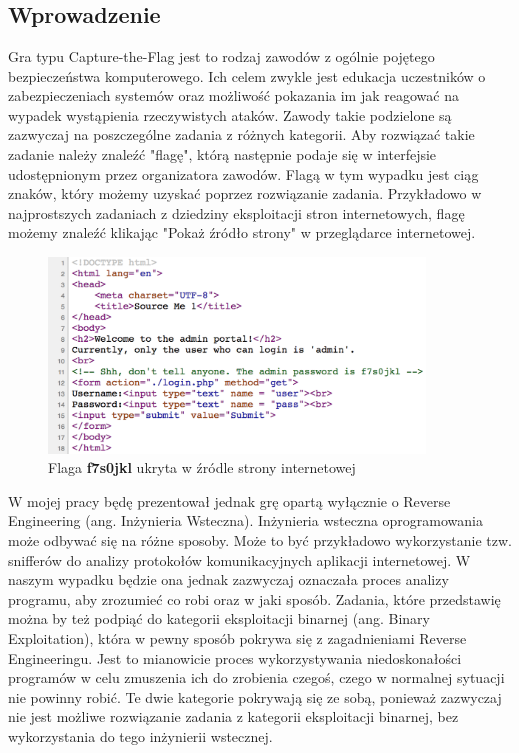 \documentclass[polish,12pt]{aghthesis}
\author{Piotr Szczygieł}
\date{\the\year}
\begin{document}
\maketitle

\tableofcontents
\newpage

\section{\SectionTitleProjectVision}
\label{sec:cel-wizja}

\subsection{Wprowadzenie}

Gra typu Capture-the-Flag jest to rodzaj zawodów z ogólnie pojętego
bezpieczeństwa komputerowego. Ich celem zwykle jest edukacja uczestników
o zabezpieczeniach systemów oraz możliwość pokazania im jak reagować
na wypadek wystąpienia rzeczywistych ataków. Zawody takie podzielone są zazwyczaj
na poszczególne zadania z różnych kategorii. Aby rozwiązać takie zadanie należy
znaleźć "flagę", którą następnie podaje się w interfejsie udostępnionym przez
organizatora zawodów. Flagą w tym wypadku jest ciąg znaków, który możemy uzyskać
poprzez rozwiązanie zadania. Przykładowo w najprostszych zadaniach
z dziedziny eksploitacji stron internetowych, flagę możemy znaleźć klikając
"Pokaż źródło strony" w przeglądarce internetowej.

\begin{figure}[ht]
    \centering
    \includegraphics[width=10cm]{flag_page_source}
    \caption{Flaga \textbf{f7s0jkl} ukryta w źródle strony internetowej}
    \label{fig:flag_page_source}
\end{figure}

W mojej pracy będę prezentował jednak grę opartą
wyłącznie o Reverse Engineering (ang. Inżynieria Wsteczna).
Inżynieria wsteczna oprogramowania może odbywać się na różne sposoby.
Może to być przykładowo wykorzystanie tzw. snifferów do analizy protokołów
komunikacyjnych aplikacji internetowej. W naszym wypadku będzie ona jednak
zazwyczaj oznaczała proces analizy programu, aby zrozumieć co robi
oraz w jaki sposób. Zadania, które przedstawię można by też podpiąć do kategorii
eksploitacji binarnej (ang. Binary Exploitation), która w pewny sposób pokrywa
się z zagadnieniami Reverse Engineeringu. Jest to mianowicie proces
wykorzystywania niedoskonałości programów w celu zmuszenia ich do zrobienia
czegoś, czego w normalnej sytuacji nie powinny robić. Te dwie kategorie pokrywają
się ze sobą, ponieważ zazwyczaj nie jest możliwe rozwiązanie zadania z kategorii
eksploitacji binarnej, bez wykorzystania do tego inżynierii wstecznej. \pagebreak
\end{document}
